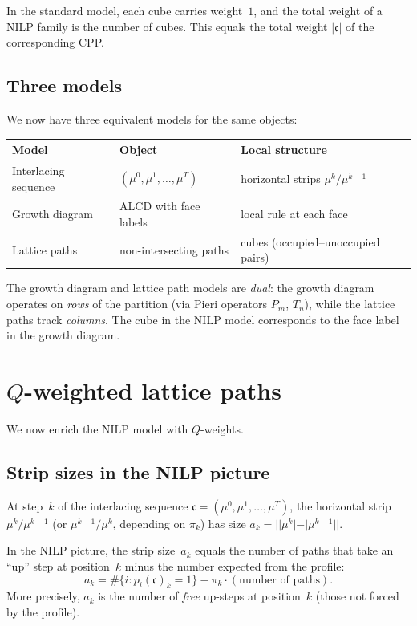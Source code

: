 \documentclass[11pt]{article}
\theoremstyle{plain}
\theoremstyle{definition}
\begin{document}
In the standard model, each cube carries weight~$1$, and the
total weight of a NILP family is the number of cubes.  This
equals the total weight $|\mathfrak{c}|$ of the corresponding
CPP\@.


\subsection{Three models}

We now have three equivalent models for the same objects:
\begin{center}
\begin{tabular}{l|l|l}
\textbf{Model} & \textbf{Object} & \textbf{Local structure}
  \\ \hline
Interlacing sequence &
  $(\mu^0, \mu^1, \ldots, \mu^T)$ &
  horizontal strips $\mu^k / \mu^{k-1}$ \\
Growth diagram &
  ALCD with face labels &
  local rule at each face \\
Lattice paths &
  non-intersecting paths &
  cubes (occupied--unoccupied pairs)
\end{tabular}
\end{center}

The growth diagram and lattice path models are
\emph{dual}: the growth diagram operates on
\emph{rows} of the partition (via Pieri operators $P_m$,
$T_n$), while the lattice paths track \emph{columns}.
The cube in the NILP model corresponds to the face label in
the growth diagram.


\section{$Q$-weighted lattice paths}
\label{sec:Q-paths}

We now enrich the NILP model with $Q$-weights.


\subsection{Strip sizes in the NILP picture}

At step~$k$ of the interlacing sequence
$\mathfrak{c} = (\mu^0, \mu^1, \ldots, \mu^T)$, the
horizontal strip $\mu^k / \mu^{k-1}$ (or
$\mu^{k-1} / \mu^k$, depending on $\pi_k$) has size
$a_k = ||\mu^k| - |\mu^{k-1}||$.

In the NILP picture, the strip size~$a_k$ equals the number of
paths that take an ``up'' step at position~$k$ minus the number
expected from the profile:
\begin{equation}\label{eq:strip-NILP}
  a_k = \#\{i : p_i(\mathfrak{c})_k = 1\} - \pi_k
    \cdot (\text{number of paths}).
\end{equation}
More precisely, $a_k$ is the number of \emph{free} up-steps
at position~$k$ (those not forced by the profile).
\end{document}

